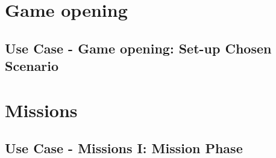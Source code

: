 \documentclass[12pt,letterpaper]{scrreprt}
\begin{document}
        \section{Game opening}
                \subsection{Use Case - Game opening: Set-up Chosen Scenario}
	\section{Missions}
		\subsection{Use Case - Missions I: Mission Phase}
\end{document}
